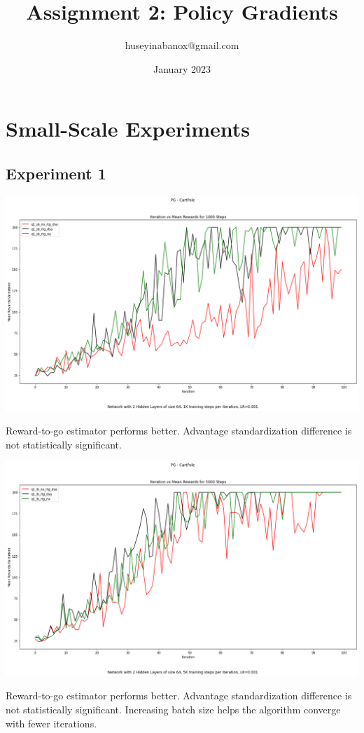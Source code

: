 \documentclass[11pt]{article}
\title{Assignment 2: Policy Gradients}
\author{huseyinabanox@gmail.com}
\date{January 2023}
\begin{document}
    \maketitle

    \section{Small-Scale Experiments}

    \subsection{Experiment 1}

    \includegraphics[scale=0.35]{q1_sb_plot}

    Reward-to-go estimator performs better.
    Advantage standardization difference is not statistically significant.


    \hspace*{-0.5in}
    \includegraphics[scale=0.35]{q1_lb_plot}

    Reward-to-go estimator performs better.
    Advantage standardization difference is not statistically significant.
    Increasing batch size helps the algorithm converge with fewer iterations.
\end{document}
